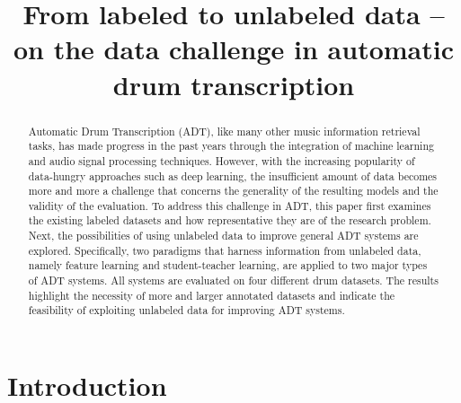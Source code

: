 \documentclass{article}
\title{From labeled to unlabeled data -- on the data challenge in automatic drum transcription}
\begin{document}
%
\maketitle
%
\begin{abstract}
Automatic Drum Transcription (ADT), like many other music information retrieval tasks, has made progress in the past years through the integration of machine learning and audio signal processing techniques. However, with the increasing popularity of data-hungry approaches such as deep learning, the insufficient amount of data becomes more and more a challenge that concerns the generality of the resulting models and the validity of the evaluation. To address this challenge in ADT, this paper first examines the existing labeled datasets and how representative they are of the research problem. Next, the possibilities of using unlabeled data to improve general ADT systems are explored. Specifically, two paradigms that harness information from unlabeled data, namely feature learning and student-teacher learning, are applied to two major types of ADT systems. All systems are evaluated on four different drum datasets. The results highlight the necessity of more and larger annotated datasets and indicate the feasibility of exploiting unlabeled data for improving ADT systems.
\end{abstract}

%
\section{Introduction}\label{sec:introduction}
\end{document}
